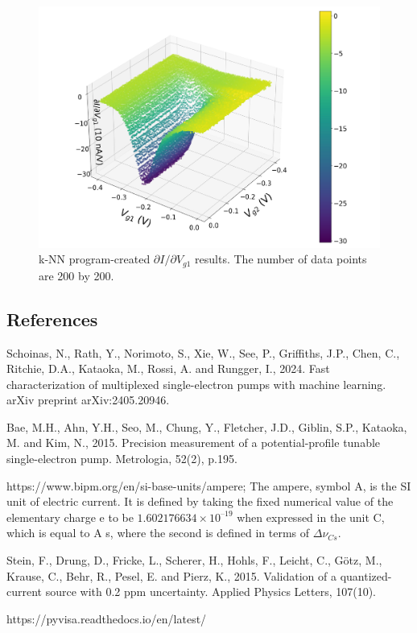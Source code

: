 \documentclass[jkps,preprint,fleqn,showpacs,showkeys]{revtex4}
\begin{document}
\renewcommand{\figurename}{Fig. }
\begin{figure}[b]
\centering
\includegraphics[width=12cm]{Fig_didv}
\parbox{13cm}{\vspace*{0.5cm}
\caption{k-NN program-created $\partial I/\partial V_{g1}$ results. The number of data points are 200 by
200. }
\label{plot1}}
\end{figure}



\begin{thebibliography}{99}
\section*{References}

Schoinas, N., Rath, Y., Norimoto, S., Xie, W., See, P., Griffiths, J.P., Chen, C., Ritchie, D.A., Kataoka, M., Rossi, A. and Rungger, I., 2024. Fast characterization of multiplexed single-electron pumps with machine learning. arXiv preprint arXiv:2405.20946.


Bae, M.H., Ahn, Y.H., Seo, M., Chung, Y., Fletcher, J.D., Giblin, S.P., Kataoka, M. and Kim, N., 2015. Precision measurement of a potential-profile tunable single-electron pump. Metrologia, 52(2), p.195.


https://www.bipm.org/en/si-base-units/ampere;
The ampere, symbol A, is the SI unit of electric current. It is defined by taking the fixed numerical value of the elementary charge e to be $1.602 176 634 \times 10^{–19}$ when expressed in the unit C, which is equal to A s, where the second is defined in terms of $\Delta \nu _{Cs}$.

Stein, F., Drung, D., Fricke, L., Scherer, H., Hohls, F., Leicht, C., Götz, M., Krause, C., Behr, R., Pesel, E. and Pierz, K., 2015. Validation of a quantized-current source with 0.2 ppm uncertainty. Applied Physics Letters, 107(10).

https://pyvisa.readthedocs.io/en/latest/





\end{thebibliography}
\end{document}
